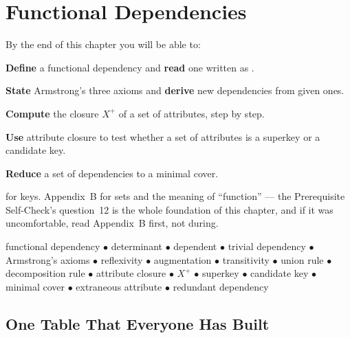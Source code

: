 \chapter{Functional Dependencies}\label{ch:fds}

\begin{outcomes}
By the end of this chapter you will be able to:
\begin{tight}
  \item \textbf{Define} a functional dependency and \textbf{read} one written
        as .
  \item \textbf{State} Armstrong's three axioms and \textbf{derive} new
        dependencies from given ones.
  \item \textbf{Compute} the closure $X^{+}$ of a set of attributes, step by
        step.
  \item \textbf{Use} attribute closure to test whether a set of attributes is
        a superkey or a candidate key.
  \item \textbf{Reduce} a set of dependencies to a minimal cover.
\end{tight}
\end{outcomes}

\begin{prereq}
 for keys. Appendix~B for sets and the meaning of
``function'' --- the Prerequisite Self-Check's question~12 is the whole
foundation of this chapter, and if it was uncomfortable, read Appendix~B
first, not during.
\end{prereq}

\begin{keyterms}
functional dependency $\bullet$ determinant $\bullet$ dependent $\bullet$
trivial dependency $\bullet$ Armstrong's axioms $\bullet$ reflexivity
$\bullet$ augmentation $\bullet$ transitivity $\bullet$ union rule $\bullet$
decomposition rule $\bullet$ attribute closure $\bullet$ $X^{+}$ $\bullet$
superkey $\bullet$ candidate key $\bullet$ minimal
cover $\bullet$ extraneous attribute $\bullet$ redundant dependency
\end{keyterms}

\section{One Table That Everyone Has Built}

